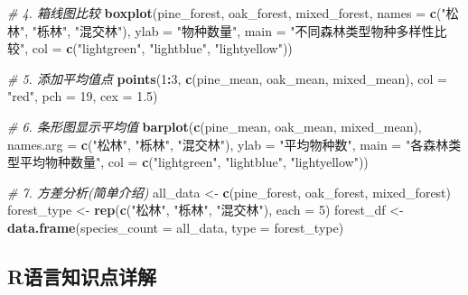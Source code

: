 \documentclass[
  twoside]{book}
\newenvironment{Shaded}{\begin{snugshade}}{\end{snugshade}}
\newcommand{\AttributeTok}[1]{\textcolor[rgb]{0.13,0.29,0.53}{#1}}
\newcommand{\CommentTok}[1]{\textcolor[rgb]{0.56,0.35,0.01}{\textit{#1}}}
\newcommand{\DecValTok}[1]{\textcolor[rgb]{0.00,0.00,0.81}{#1}}
\newcommand{\FloatTok}[1]{\textcolor[rgb]{0.00,0.00,0.81}{#1}}
\newcommand{\FunctionTok}[1]{\textcolor[rgb]{0.13,0.29,0.53}{\textbf{#1}}}
\newcommand{\NormalTok}[1]{#1}
\newcommand{\OtherTok}[1]{\textcolor[rgb]{0.56,0.35,0.01}{#1}}
\newcommand{\SpecialCharTok}[1]{\textcolor[rgb]{0.81,0.36,0.00}{\textbf{#1}}}
\newcommand{\StringTok}[1]{\textcolor[rgb]{0.31,0.60,0.02}{#1}}
\begin{document}
\begin{Shaded}
\begin{Highlighting}[]
\CommentTok{\# 4. 箱线图比较}
\FunctionTok{boxplot}\NormalTok{(pine\_forest, oak\_forest, mixed\_forest,}
        \AttributeTok{names =} \FunctionTok{c}\NormalTok{(}\StringTok{"松林"}\NormalTok{, }\StringTok{"栎林"}\NormalTok{, }\StringTok{"混交林"}\NormalTok{),}
        \AttributeTok{ylab =} \StringTok{"物种数量"}\NormalTok{, }
        \AttributeTok{main =} \StringTok{"不同森林类型物种多样性比较"}\NormalTok{,}
        \AttributeTok{col =} \FunctionTok{c}\NormalTok{(}\StringTok{"lightgreen"}\NormalTok{, }\StringTok{"lightblue"}\NormalTok{, }\StringTok{"lightyellow"}\NormalTok{))}

\CommentTok{\# 5. 添加平均值点}
\FunctionTok{points}\NormalTok{(}\DecValTok{1}\SpecialCharTok{:}\DecValTok{3}\NormalTok{, }\FunctionTok{c}\NormalTok{(pine\_mean, oak\_mean, mixed\_mean), }
       \AttributeTok{col =} \StringTok{"red"}\NormalTok{, }\AttributeTok{pch =} \DecValTok{19}\NormalTok{, }\AttributeTok{cex =} \FloatTok{1.5}\NormalTok{)}

\CommentTok{\# 6. 条形图显示平均值}
\FunctionTok{barplot}\NormalTok{(}\FunctionTok{c}\NormalTok{(pine\_mean, oak\_mean, mixed\_mean),}
        \AttributeTok{names.arg =} \FunctionTok{c}\NormalTok{(}\StringTok{"松林"}\NormalTok{, }\StringTok{"栎林"}\NormalTok{, }\StringTok{"混交林"}\NormalTok{),}
        \AttributeTok{ylab =} \StringTok{"平均物种数"}\NormalTok{,}
        \AttributeTok{main =} \StringTok{"各森林类型平均物种数量"}\NormalTok{,}
        \AttributeTok{col =} \FunctionTok{c}\NormalTok{(}\StringTok{"lightgreen"}\NormalTok{, }\StringTok{"lightblue"}\NormalTok{, }\StringTok{"lightyellow"}\NormalTok{))}

\CommentTok{\# 7. 方差分析(简单介绍)}
\NormalTok{all\_data }\OtherTok{\textless{}{-}} \FunctionTok{c}\NormalTok{(pine\_forest, oak\_forest, mixed\_forest)}
\NormalTok{forest\_type }\OtherTok{\textless{}{-}} \FunctionTok{rep}\NormalTok{(}\FunctionTok{c}\NormalTok{(}\StringTok{"松林"}\NormalTok{, }\StringTok{"栎林"}\NormalTok{, }\StringTok{"混交林"}\NormalTok{), }\AttributeTok{each =} \DecValTok{5}\NormalTok{)}
\NormalTok{forest\_df }\OtherTok{\textless{}{-}} \FunctionTok{data.frame}\NormalTok{(}\AttributeTok{species\_count =}\NormalTok{ all\_data, }\AttributeTok{type =}\NormalTok{ forest\_type)}
\end{Highlighting}
\end{Shaded}

\hypertarget{rux8bedux8a00ux77e5ux8bc6ux70b9ux8be6ux89e3-6}{%
\subsection{R语言知识点详解}\label{rux8bedux8a00ux77e5ux8bc6ux70b9ux8be6ux89e3-6}}
\end{document}
